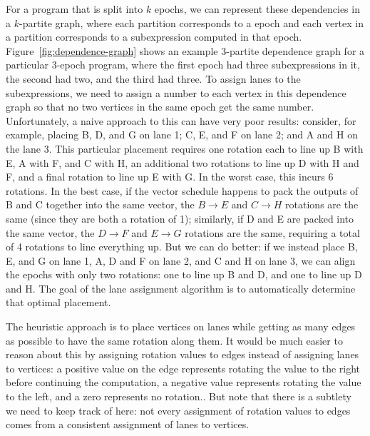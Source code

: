 For a program that is split into $k$ epochs, we can represent these dependencies in a $k$-partite graph, where each partition corresponds to a epoch and each vertex in a partition corresponds to a subexpression computed in that epoch.
Figure~\ref{fig:dependence-graph} shows an example 3-partite dependence graph for a particular 3-epoch program, where the first epoch had three subexpressions in it, the second had two, and the third had three.
To assign lanes to the subexpressions, we need to assign a number to each vertex in this dependence graph so that no two vertices in the same epoch get the same number.
Unfortunately, a naive approach to this can have very poor results: consider, for example, placing B, D, and G on lane 1; C, E, and F on lane 2; and A and H on the lane 3.
This particular placement requires one rotation each to line up B with E, A with F, and C with H, an additional two rotations to line up D with H and F, and a final rotation to line up E with G.
In the worst case, this incurs 6 rotations.
In the best case, if the vector schedule happens to pack the outputs of B and C together into the same vector, the $B\rightarrow E$ and $C\rightarrow H$ rotations are the same (since they are both a rotation of 1); similarly, if D and E are packed into the same vector, the $D\rightarrow F$ and $E\rightarrow G$ rotations are the same, requiring a total of 4 rotations to line everything up. 
But we can do better: if we instead place B, E, and G on lane 1, A, D and F on lane 2, and C and H on lane 3, we can align the epochs with only two rotations: one to line up B and D, and one to line up D and H. 
The goal of the lane assignment algorithm is to automatically determine that optimal placement.

The heuristic approach is to place vertices on lanes while getting as many edges as possible to have the same rotation along them.
It would be much easier to reason about this by assigning rotation values to edges instead of assigning lanes to vertices: a positive value on the edge represents rotating the value to the right before continuing the computation, a negative value represents rotating the value to the left, and a zero represents no rotation.. But note that there is a subtlety we need to keep track of here: not every assignment of rotation values to edges comes from a consistent assignment of lanes to vertices. 

